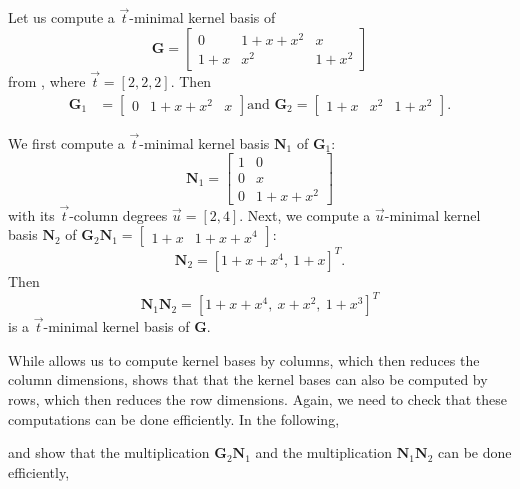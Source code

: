 \begin{example}
Let us compute a $\vec{t}$-minimal kernel basis of 
\[
\mathbf{G}=\left[\begin{array}{ccc}
0 & 1+x+x^{2} & x\\
1+x & x^{2} & 1+x^{2}
\end{array}\right]
\]
 from , where $\vec{t}=\left[2,2,2\right]$.
Then 
\begin{align*}
\mathbf{G}_{1} & =\left[\begin{array}{ccc}
0 & 1+x+x^{2} & x\end{array}\right]\mbox{and }\mathbf{G}_{2}=\left[\begin{array}{ccc}
1+x & x^{2} & 1+x^{2}\end{array}\right].
\end{align*}


We first compute a $\vec{t}$-minimal kernel basis $\mathbf{N}_{1}$
of $\mathbf{G}_{1}$: 
\[
\mathbf{N}_{1}=\left[\begin{array}{cc}
1 & 0\\
0 & x\\
0 & 1+x+x^{2}
\end{array}\right]
\]
 with its $\vec{t}$-column degrees $\vec{u}=\left[2,4\right]$. Next,
we compute a $\vec{u}$-minimal kernel basis $\mathbf{N}_{2}$ of
$\mathbf{G}_{2}\mathbf{N}_{1}=\left[\begin{array}{cc}
1+x & 1+x+x^{4}\end{array}\right]$: 
\[
\mathbf{N}_{2}=[1+x+x^{4},\ 1+x]^{T}.
\]
 Then 
\[
\mathbf{N}_{1}\mathbf{N}_{2}=[1+x+x^{4},\ x+x^{2},\ 1+x^{3}]^{T}
\]
 is a $\vec{t}$-minimal kernel basis of $\mathbf{G}$. 
\end{example}
While  allows
us to compute kernel bases by columns, which then reduces the column
dimensions, 
shows that that the kernel bases can also be computed by rows, which
then reduces the row dimensions. Again, we need to check that these
computations can be done efficiently. In the following, %
\begin{comment}
\prettyref{lem:sizeOfG2N1} shows that the size of $\mathbf{G}_{2}\mathbf{N}_{1}$
is within a required bound. Then 
\end{comment}
{}  and 
show that the multiplication $\mathbf{G}_{2}\mathbf{N}_{1}$ and the
multiplication $\mathbf{N}_{1}\mathbf{N}_{2}$ can be done efficiently,

